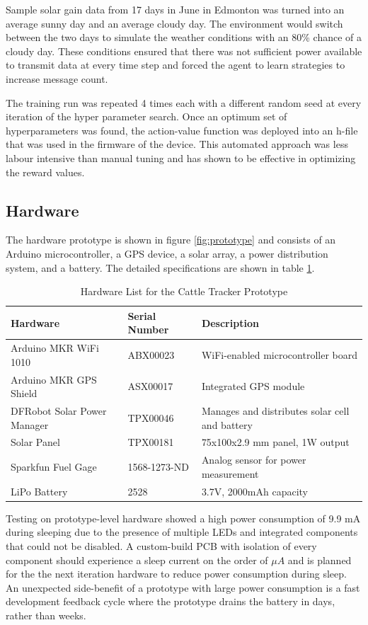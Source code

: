 \documentclass[10pt]{cai}
\begin{document}
Sample solar gain data from 17 days in June in Edmonton was turned into an average sunny day and an average cloudy day. 
The environment would switch between the two days to simulate the weather conditions with an 80\% chance of a cloudy day.
These conditions ensured that there was not sufficient power available to transmit data at every time step and forced the agent to learn strategies to increase message count.

The training run was repeated 4 times each with a different random seed at every iteration of the hyper parameter search.
Once an optimum set of hyperparameters was found, the action-value function was deployed into an h-file that was used in the firmware of the device.
This automated approach was less labour intensive than manual tuning and has shown to be effective in optimizing the reward values.

\subsection{Hardware}
The hardware prototype is shown in figure \ref{fig:prototype} and consists of an Arduino microcontroller, a GPS device, a solar array, a power distribution system, and a battery.
The detailed specifications are shown in table \ref{tab:hardware_inventory}.

\begin{table}[h!]
  \centering
  \caption{Hardware List for the Cattle Tracker Prototype}
  \begin{tabular}{|l|l|l|}
  \hline
  \textbf{Hardware} & \textbf{Serial Number} &  \textbf{Description} \\ \hline
  Arduino MKR WiFi 1010 & ABX00023 &  WiFi-enabled microcontroller board \\ \hline
  Arduino MKR GPS Shield & ASX00017 &  Integrated GPS module \\ \hline
  DFRobot Solar Power Manager & TPX00046 &  Manages and distributes solar cell and battery \\ \hline
  Solar Panel & TPX00181 &  75x100x2.9 mm panel, 1W output \\ \hline
  Sparkfun Fuel Gage & 1568-1273-ND & Analog sensor for power measurement \\ \hline
  LiPo Battery & 2528 &  3.7V, 2000mAh capacity \\ \hline
  \end{tabular}
  \label{tab:hardware_inventory}
  \end{table}

Testing on prototype-level hardware showed a high power consumption of 9.9 mA during sleeping due to the presence of multiple LEDs and integrated components that could not be disabled. 
A custom-build PCB with isolation of every component should experience a sleep current on the order of $\mu A$ and is planned for the the next iteration hardware to reduce power consumption during sleep.
An unexpected side-benefit of a prototype with large power consumption is a fast development feedback cycle where the prototype drains the battery in days, rather than weeks. 
\end{document}
